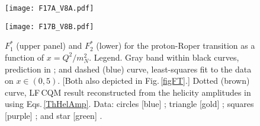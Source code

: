 \begin{figure}[!t]
%
\texttt{[image: F17A\_V8A.pdf]}\hspace*{0.9em}
\vspace*{1ex}

\centerline{%
\texttt{[image: F17B\_V8B.pdf]}}
%
%
\caption{\label{aznauryanLFQM}
%
$F_{1}^{\ast}$ (upper panel) and $F_{2}^{\ast}$ (lower) for the proton-Roper transition as a function of $x=Q^2/m_N^2$.
%
Legend.  Gray band within black curves, prediction in \cite{Segovia:2015hra};
%
and dashed (blue) curve, least-squares fit to the data on $x \in (0,5)$.  [Both also depicted in Fig.\,\ref{figFT}.]
%
Dotted (brown) curve, LF\,CQM result reconstructed from the helicity amplitudes in \cite{Aznauryan:2016wwm} using Eqs.\,\eqref{ThHelAmp}.
%
Data: circles [blue] \cite{Aznauryan:2009mx};
triangle [gold] \cite{Dugger:2009pn};
squares [purple] \cite{Mokeev:2012vsa, Mokeev:2015lda};
and star [green] \cite{Olive:2016xmw}.
}
\end{figure}

